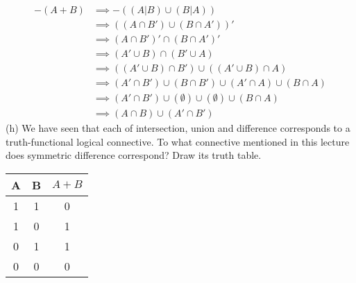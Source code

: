 \documentclass{article}
\begin{document}
\begin{align*}
    -(A+B) &\implies -((A|B) \cup (B|A))\\
           &\implies ((A \cap B') \cup (B \cap A'))'\\
           &\implies (A \cap B')' \cap (B \cap A')'\\
           &\implies (A' \cup B) \cap (B' \cup A)\\
           &\implies ((A' \cup B) \cap B') \cup ((A' \cup B) \cap A)\\
           &\implies (A' \cap B') \cup (B \cap B') \cup (A' \cap A) \cup (B \cap A)\\
           &\implies (A' \cap B') \cup (\emptyset) \cup (\emptyset) \cup (B \cap A)\\
           &\implies (A \cap B) \cup (A' \cap B')
\end{align*}
(h) We have seen that each of intersection, union and difference corresponds to a truth-functional logical connective. To what connective mentioned in this lecture does symmetric difference correspond? Draw its truth table.
\begin{table}[h!]
    \label{tab:table1}
    \centering
    \begin{tabular}{c|c|c}
        \textbf{A} & \textbf{B} & \textbf{$A+B$}\\
        \hline
        1 & 1 & 0\\
        \hline
        1 & 0 & 1\\
        \hline
        0 & 1 & 1\\
        \hline
        0 & 0 & 0\\
    \end{tabular}
\end{table}
\end{document}
